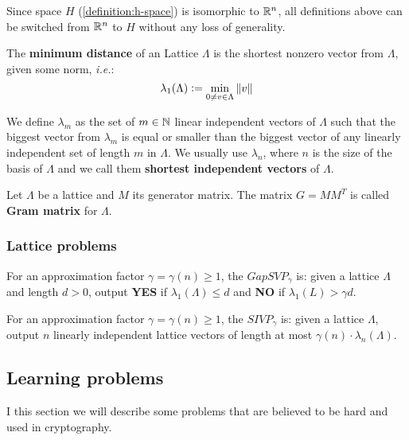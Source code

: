 \documentclass[a4paper,12pt]{article}
\begin{document}
Since space \(H\) (\ref{definition:h-space}) is isomorphic to \(\mathbb{R}^n\), all definitions above can be switched from \(\mathbb{R}^n\) to \(H\) without any loss of generality.

\begin{definition}
  The \textbf{minimum distance} of an Lattice $\Lambda$ is the shortest nonzero vector
  from $\Lambda$, given some norm, \textit{i.e.}:
  $$
  \lambda_1(\Lambda) \vcentcolon = \min_{0 \ne v \in \Lambda}{\|v\|}
  $$

  We define $\lambda_m$ as the set of $m \in \mathbb{N}$  linear independent vectors of $\Lambda$
  such that the biggest vector from $\lambda_m$ is equal or smaller than the biggest vector of any linearly independent set of length $m$ in $\Lambda$. We usually use
  $\lambda_n$, where $n$ is the size of the basis of $\Lambda$ and we call them
  \textbf{shortest independent vectors} of $\Lambda$.
\end{definition}

\begin{definition}\label{definition:gram-matrix}
  Let $\Lambda$ be a lattice and $M$ its generator matrix. The matrix $G = MM^T$ is called \textbf{Gram matrix} for $\Lambda$.
\end{definition}
\subsubsection{Lattice problems}
\label{sec:org8f5df3f}
\begin{definition}
  \label{definition:gapsvp}
For an approximation factor $\gamma  = \gamma(n) \geq 1$, the $GapSVP_\gamma $ is: given a lattice
$\Lambda$ and length $d > 0$, output \textbf{YES} if $\lambda_1(\Lambda) \leq d$ and \textbf{NO} if
$\lambda_1(L) > \gamma d$.  
\end{definition}

\begin{definition}
  \label{definition:sivp}
  For an approximation factor $\gamma = \gamma(n) \geq 1$, the $SIVP_\gamma$ is: given a lattice $\Lambda$, output $n$ linearly independent lattice vectors of length at most $\gamma(n) \cdot \lambda_n(\Lambda)$.
\end{definition}

\subsection{Learning problems}
\label{sec:orga5bdda4}
I this section we will describe some problems that are believed to be hard and used in cryptography. 
\end{document}
